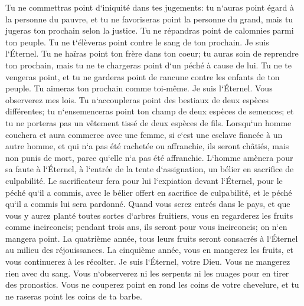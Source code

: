 \verse Tu ne commettras point d`iniquité dans tes jugements: tu n`auras point égard à la personne du pauvre, et tu ne favoriseras point la personne du grand, mais tu jugeras ton prochain selon la justice. 
\verse Tu ne répandras point de calomnies parmi ton peuple. Tu ne t`élèveras point contre le sang de ton prochain. Je suis l`Éternel. 
\verse Tu ne haïras point ton frère dans ton coeur; tu auras soin de reprendre ton prochain, mais tu ne te chargeras point d`un péché à cause de lui. 
\verse Tu ne te vengeras point, et tu ne garderas point de rancune contre les enfants de ton peuple. Tu aimeras ton prochain comme toi-même. Je suis l`Éternel. 
\verse Vous observerez mes lois. Tu n`accoupleras point des bestiaux de deux espèces différentes; tu n`ensemenceras point ton champ de deux espèces de semences; et tu ne porteras pas un vêtement tissé de deux espèces de fils. 
\verse Lorsqu`un homme couchera et aura commerce avec une femme, si c`est une esclave fiancée à un autre homme, et qui n`a pas été rachetée ou affranchie, ils seront châtiés, mais non punis de mort, parce qu`elle n`a pas été affranchie. 
\verse L`homme amènera pour sa faute à l`Éternel, à l`entrée de la tente d`assignation, un bélier en sacrifice de culpabilité. 
\verse Le sacrificateur fera pour lui l`expiation devant l`Éternel, pour le péché qu`il a commis, avec le bélier offert en sacrifice de culpabilité, et le péché qu`il a commis lui sera pardonné. 
\verse Quand vous serez entrés dans le pays, et que vous y aurez planté toutes sortes d`arbres fruitiers, vous en regarderez les fruits comme incirconcis; pendant trois ans, ils seront pour vous incirconcis; on n`en mangera point. 
\verse La quatrième année, tous leurs fruits seront consacrés à l`Éternel au milieu des réjouissances. 
\verse La cinquième année, vous en mangerez les fruits, et vous continuerez à les récolter. Je suis l`Éternel, votre Dieu. 
\verse Vous ne mangerez rien avec du sang. Vous n`observerez ni les serpents ni les nuages pour en tirer des pronostics. 
\verse Vous ne couperez point en rond les coins de votre chevelure, et tu ne raseras point les coins de ta barbe. 
